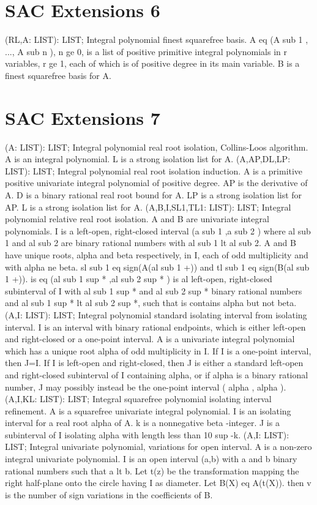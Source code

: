 \section{ SAC Extensions 6  } 
 (RL,A: LIST): LIST; \eproc
\bcom Integral polynomial finest squarefree basis. A eq (A sub 1 , ...,
A sub n ), n ge 0, is a list of positive primitive integral
polynomials in r variables, r ge 1, each of which is of positive
degree in its main variable. B is a finest squarefree basis for A. \ecom 
\section{ SAC Extensions 7  } 
 (A: LIST): LIST; \eproc
\bcom Integral polynomial real root isolation, Collins-Loos algorithm.
A is an integral polynomial. L is a strong isolation list for A. \ecom 
{} (A,AP,DL,LP: LIST): LIST; \eproc
\bcom Integral polynomial real root isolation induction. A is a primitive
positive univariate integral polynomial of positive degree.  AP is
the derivative of A.  D is a binary rational real root bound for A.
LP is a strong isolation list for AP.  L is a strong isolation list
for A. \ecom 
{} (A,B,I,SL1,TL1: LIST): LIST; \eproc
\bcom Integral polynomial relative real root isolation. A and B are
univariate integral polynomials.  I is a left-open, right-closed
interval (a sub 1 ,a sub 2 ) where al sub 1 and al sub 2 are
binary rational numbers with al sub 1 lt al sub 2.  A and B have
unique roots, alpha and beta respectively, in I, each of odd
multiplicity and with alpha ne beta.  sl sub 1 eq
sign(A(al sub 1 +)) and tl sub 1 eq sign(B(al sub 1 +)).
is eq (al sub 1 sup * ,al sub 2 sup * ) is al left-open, right-closed
subinterval of I with al sub 1 sup * and al sub 2 sup *
binary rational numbers and al sub 1 sup * lt al sub 2 sup *,
such that is contains alpha but not beta. \ecom 
{} (A,I: LIST): LIST; \eproc
\bcom Integral polynomial standard isolating interval from isolating interval.
I is an interval with binary rational endpoints, which is either 
left-open and right-closed or a one-point interval.  A is a univariate
integral polynomial which has a unique root alpha
of odd multiplicity in I.  If I is a one-point interval, then
J=I.  If I is left-open and right-closed, then J is either a
standard left-open and right-closed subinterval of I containing
alpha, or if alpha is a binary rational number, J may
possibly instead be the one-point interval ( alpha , alpha ). \ecom 
{} (A,I,KL: LIST): LIST; \eproc
\bcom Integral squarefree polynomial isolating interval refinement.
A is a squarefree univariate integral polynomial.  I is an
isolating interval for a real root alpha of A.  k is a
nonnegative beta -integer.  J is a subinterval of I isolating alpha
with length less than 10 sup -k. \ecom 
{} (A,I: LIST): LIST; \eproc
\bcom Integral univariate polynomial, variations for open interval.
A is a non-zero integral univariate polynomial.  I is an open
interval (a,b) with a and b binary rational numbers such that
a lt b.  Let t(z) be the transformation mapping the right half-plane
onto the circle having I as diameter.  Let B(X) eq A(t(X)).
then v is the number of sign variations in the coefficients of B. \ecom 
